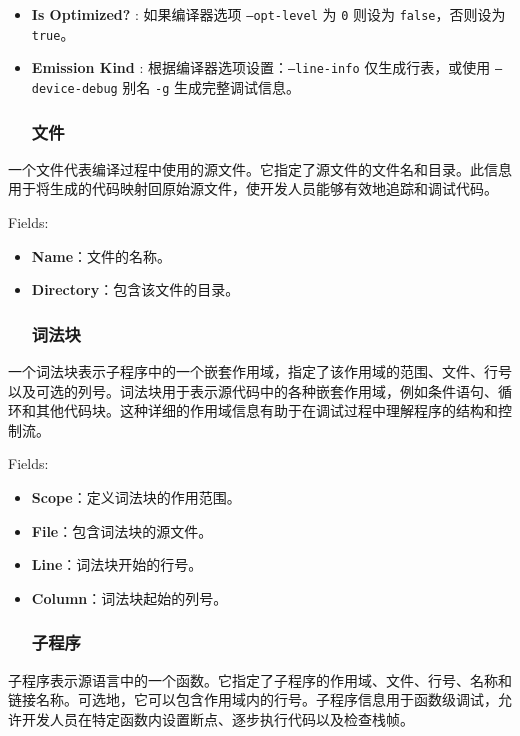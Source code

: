 \documentclass{article}
\begin{document}
\begin{itemize}
\item \textbf{Is Optimized?} : 如果编译器选项 \texttt{--opt-level} 为 \texttt{0} 则设为 \texttt{false}，否则设为 \texttt{true}。
\item \textbf{Emission Kind} : 根据编译器选项设置：\texttt{--line-info} 仅生成行表，或使用 \texttt{--device-debug} 别名 \texttt{-g} 生成完整调试信息。


\subsubsection{文件}

\end{itemize}
一个文件代表编译过程中使用的源文件。它指定了源文件的文件名和目录。此信息用于将生成的代码映射回原始源文件，使开发人员能够有效地追踪和调试代码。


Fields:

\begin{itemize}
\item \textbf{Name}：文件的名称。
\item \textbf{Directory}：包含该文件的目录。


\subsubsection{词法块}

\end{itemize}
一个词法块表示子程序中的一个嵌套作用域，指定了该作用域的范围、文件、行号以及可选的列号。词法块用于表示源代码中的各种嵌套作用域，例如条件语句、循环和其他代码块。这种详细的作用域信息有助于在调试过程中理解程序的结构和控制流。


Fields:

\begin{itemize}
\item \textbf{Scope}：定义词法块的作用范围。
\item \textbf{File}：包含词法块的源文件。
\item \textbf{Line}：词法块开始的行号。
\item \textbf{Column}：词法块起始的列号。


\subsubsection{子程序}


\end{itemize}
子程序表示源语言中的一个函数。它指定了子程序的作用域、文件、行号、名称和链接名称。可选地，它可以包含作用域内的行号。子程序信息用于函数级调试，允许开发人员在特定函数内设置断点、逐步执行代码以及检查栈帧。
\end{document}
